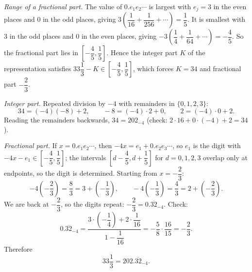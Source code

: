 \emph{Range of a fractional part.} The value of $0.e_1e_2\cdots$ is largest with $e_j=3$ in the even places and $0$ in the odd places, giving $3\left(\dfrac1{16}+\dfrac1{256}+\cdots\right)=\dfrac15$. It is smallest with $3$ in the odd places and $0$ in the even places, giving $-3\left(\dfrac14+\dfrac1{64}+\cdots\right)=-\dfrac45$. So the fractional part lies in $\left[-\dfrac45,\dfrac15\right]$. Hence the integer part $K$ of the representation satisfies $33\dfrac13-K\in\left[-\dfrac45,\dfrac15\right]$, which forces $K=34$ and fractional part $-\dfrac23$.

\emph{Integer part.} Repeated division by $-4$ with remainders in $\{0,1,2,3\}$:
\[34=(-4)(-8)+2,\qquad-8=(-4)\cdot2+0,\qquad2=(-4)\cdot0+2.\]
Reading the remainders backwards, $34=202_{-4}$ (check: $2\cdot16+0\cdot(-4)+2=34$).

\emph{Fractional part.} If $x=0.e_1e_2\cdots$, then $-4x=e_1+0.e_2e_3\cdots$, so $e_1$ is the digit with $-4x-e_1\in\left[-\dfrac45,\dfrac15\right]$; the intervals $\left[d-\dfrac45,d+\dfrac15\right]$ for $d=0,1,2,3$ overlap only at endpoints, so the digit is determined. Starting from $x=-\dfrac23$:
\[-4\left(-\dfrac23\right)=\dfrac83=3+\left(-\dfrac13\right),\qquad -4\left(-\dfrac13\right)=\dfrac43=2+\left(-\dfrac23\right).\]
We are back at $-\dfrac23$, so the digits repeat: $-\dfrac23=0.\overline{32}_{-4}$. Check:
\[0.\overline{32}_{-4}=\dfrac{3\cdot\left(-\dfrac14\right)+2\cdot\dfrac1{16}}{1-\dfrac1{16}}=-\dfrac58\cdot\dfrac{16}{15}=-\dfrac23.\]
Therefore
\[33\dfrac13=\boxed{202.\overline{32}_{-4}}.\]
